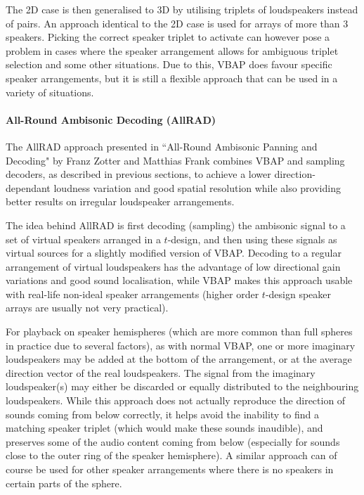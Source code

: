 The 2D case is then generalised to 3D by utilising triplets of loudspeakers instead of pairs. 
An approach identical to the 2D case is used for arrays of more than 3 speakers.
Picking the correct speaker triplet to activate can however pose a problem in cases 
where the speaker arrangement allows for ambiguous triplet selection and some other situations.
Due to this, VBAP does favour specific speaker arrangements, but it is still a flexible approach 
that can be used in a variety of situations.
\cite{pulkki_vbap_1997}\cite{ambisonics_practical_theory}

\paragraph*{All-Round Ambisonic Decoding (AllRAD)}

The AllRAD approach presented in ``All-Round Ambisonic Panning and Decoding" 
by Franz Zotter and Matthias Frank \cite{zotter_all_round_panning_and_decoding}
combines VBAP and sampling decoders, as described in previous sections, 
to achieve a lower direction-dependant loudness variation and good spatial resolution
while also providing better results on irregular loudspeaker arrangements.

The idea behind AllRAD is first decoding (sampling) the ambisonic signal to a set of virtual speakers 
arranged in a $t$-design, and then using these signals as virtual sources for 
a slightly modified version of VBAP. Decoding to a regular arrangement of virtual loudspeakers
has the advantage of low directional gain variations and good sound localisation, while VBAP
makes this approach usable with real-life non-ideal speaker arrangements
(higher order $t$-design speaker arrays are usually not very practical).

For playback on speaker hemispheres (which are more common than full spheres in practice due to several factors),
as with normal VBAP, one or more imaginary loudspeakers may be added at the bottom of the arrangement,
or at the average direction vector of the real loudspeakers. The signal from the imaginary 
loudspeaker(s) may either be discarded or equally distributed to the neighbouring loudspeakers. 
While this approach does not actually reproduce the direction of sounds coming from below correctly,
it helps avoid the inability to find a matching speaker triplet (which would make these sounds inaudible),
and preserves some of the audio content coming from below (especially for sounds close to the outer ring of the speaker hemisphere).
A similar approach can of course be used for other speaker arrangements where there is no speakers in certain parts of the sphere.
\cite{ambisonic_decoders_slides_stanford}\cite{ambisonics_practical_theory}

